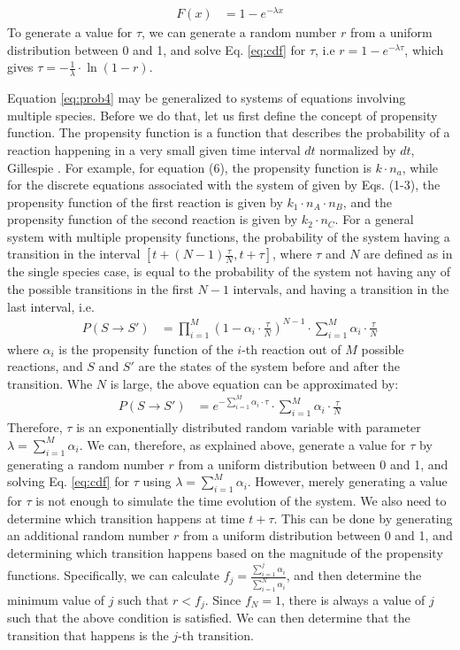 \documentclass[12pt]{article}
\begin{document}
\begin{align}
F(x) &= 1-e^{-\lambda x}
\label{eq:cdf}
\end{align}
To generate a value for $\tau$, we can generate a random number $r$ from a uniform distribution between 0 and 1, and solve Eq. \ref{eq:cdf} for $\tau$, i.e $r = 1-e^{-\lambda \tau}$, which gives $\tau = -\frac 1 \lambda \cdot \ln(1-r)$. 

Equation \ref{eq:prob4} may be generalized to systems of equations involving multiple species. Before we do that, let us first define the concept of propensity function. The propensity function is a function that describes the probability of a reaction happening in a very small given time interval $dt$ normalized by $dt$, Gillespie \cite{Gillespie2007}. For example, for equation (6), the propensity function is $k \cdot n_a$, while for the discrete equations associated with the system of  given by Eqs. (1-3), the propensity function of the first reaction is given by $k_1 \cdot n_A \cdot n_B$, and the propensity function of the second reaction is given by $k_2 \cdot n_C$.  For a general system with multiple propensity functions, the probability of the system having a transition in the interval $[t+(N-1)\frac \tau N,t+\tau]$, where $\tau$ and $N$ are defined as in the single species case, is equal to the probability of the system not having any of the possible transitions in the first $N-1$ intervals, and having a transition in the last interval, i.e.
\begin{align}
P(S \rightarrow S') &= \prod_{i=1}^{M} (1-\alpha_i \cdot \frac \tau N)^{N-1} \cdot \sum_{i=1}^{M}\alpha_i \cdot \frac \tau N
\label{eq:prob5}
\end{align}
where $\alpha_i$ is the propensity function of the $i$-th reaction out of $M$ possible reactions, and $S$ and $S'$ are the states of the system before and after the transition.  Whe $N$ is large, the above equation can be approximated by:
\begin{align}
P(S \rightarrow S') &= e^{-\sum_{i=1}^{M}\alpha_i \cdot \tau} \cdot \sum_{i=1}^{M}\alpha_i \cdot \frac \tau N
\label{eq:prob6}
\end{align}
Therefore, $\tau$ is an exponentially distributed random variable with parameter $\lambda = \sum_{i=1}^{M}\alpha_i$.  We can, therefore, as explained above, generate a value for $\tau$ by generating a random number $r$ from a uniform distribution between 0 and 1, and solving Eq. \ref{eq:cdf} for $\tau$ using $\lambda=\sum_{i=1}^{M}\alpha_i$. However, merely generating a value for $\tau$ is not enough to simulate the time evolution of the system. We also need to determine which transition happens at time $t+\tau$. This can be done by generating an additional random number $r$ from a uniform distribution between 0 and 1, and determining which transition happens based on the magnitude of the propensity functions. Specifically, we can calculate $f_j=\frac {\sum_{i=1}^{j}\alpha_i} {\sum_{i=1}^N \alpha_i}$, and then determine the minimum value of $j$ such that $r<f_j$. Since $f_N=1$, there is always a value of $j$ such that the above condition is satisfied.  We can then determine that the transition that happens is the $j$-th transition. 
\end{document}
